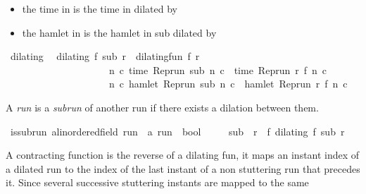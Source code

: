 \begin{isabellebody}
\begin{isamarkuptext}
\begin{itemize}
\item the time in  is the time in  dilated by 

\item the hamlet in  is the hamlet in sub dilated by %
\end{itemize}%
\end{isamarkuptext}\isamarkuptrue%
\isamarkupfalse%
\ dilating\isanewline
{}\isanewline
\ \ {\isacartoucheopen}dilating\ f\ sub\ r\ {\isasymequiv}\ dilating{\isacharunderscore}fun\ f\ r\isanewline
\ \ \ \ \ \ \ \ \ \ \ \ \ \ \ \ \ \ \ \ {\isasymand}\ {\isacharparenleft}{\isasymforall}n\ c{\isachardot}\ time\ {\isacharparenleft}{\isacharparenleft}Rep{\isacharunderscore}run\ sub{\isacharparenright}\ n\ c{\isacharparenright}\ {\isacharequal}\ time\ {\isacharparenleft}{\isacharparenleft}Rep{\isacharunderscore}run\ r{\isacharparenright}\ {\isacharparenleft}f\ n{\isacharparenright}\ c{\isacharparenright}{\isacharparenright}\isanewline
\ \ \ \ \ \ \ \ \ \ \ \ \ \ \ \ \ \ \ \ {\isasymand}\ {\isacharparenleft}{\isasymforall}n\ c{\isachardot}\ hamlet\ {\isacharparenleft}{\isacharparenleft}Rep{\isacharunderscore}run\ sub{\isacharparenright}\ n\ c{\isacharparenright}\ {\isacharequal}\ hamlet\ {\isacharparenleft}{\isacharparenleft}Rep{\isacharunderscore}run\ r{\isacharparenright}\ {\isacharparenleft}f\ n{\isacharparenright}\ c{\isacharparenright}{\isacharparenright}{\isacartoucheclose}%
\begin{isamarkuptext}%
A \emph{run} is a \emph{subrun} of another run if there exists a dilation between them.%
\end{isamarkuptext}\isamarkuptrue%
\isamarkupfalse%
\ is{\isacharunderscore}subrun\ {\isacharcolon}{\isacharcolon}{\isacartoucheopen}{\isacharprime}a{\isacharcolon}{\isacharcolon}linordered{\isacharunderscore}field\ run\ {\isasymRightarrow}\ {\isacharprime}a\ run\ {\isasymRightarrow}\ bool{\isacartoucheclose}\ {\isacharparenleft}\ {\isacartoucheopen}{\isasymlless}{\isacartoucheclose}\ {}{}{\isacharparenright}\isanewline
{}\isanewline
\ \ {\isacartoucheopen}sub\ {\isasymlless}\ r\ {\isasymequiv}\ {\isacharparenleft}{\isasymexists}f{\isachardot}\ dilating\ f\ sub\ r{\isacharparenright}{\isacartoucheclose}%
\begin{isamarkuptext}%
A contracting function is the reverse of a dilating fun, it maps an instant index 
  of a dilated run to the index of the last instant of a non stuttering run that
  precedes it. Since several successive stuttering instants are mapped to the same

\end{isamarkuptext}
\end{isabellebody}
